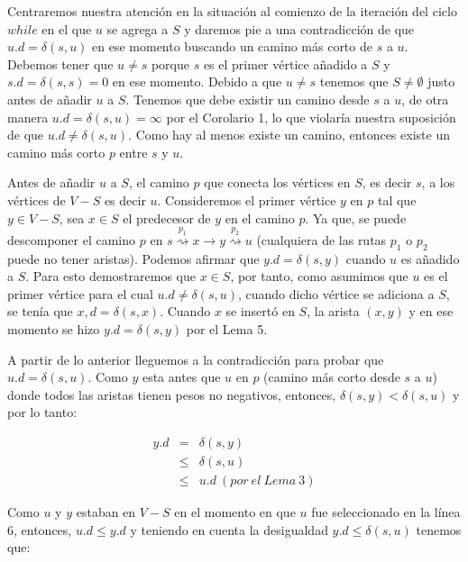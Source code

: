 \documentclass[12pt]{article}
\newcommand{\nl}{\vspace{0.3cm}}
\begin{document}
\nl

Centraremos nuestra atención en la situación al comienzo de la iteración del ciclo $while$ en el que $u$ se agrega a $S$ y daremos pie a una contradicción de que $u.d = \delta(s, u)$ en ese momento buscando un camino más corto de $s$ a $u$. Debemos tener que $u \neq s$ porque $s$ es el primer vértice añadido a $S$ y $s.d = \delta(s, s) = 0$ en ese momento. Debido a que $u \neq s$ tenemos que $S \neq \emptyset$ justo antes de añadir $u$ a $S$. Tenemos que debe existir un camino desde $s$ a $u$, de otra manera $u.d = \delta(s, u) = \infty$ por el Corolario 1, lo que violaría nuestra suposición de que $u.d \neq \delta(s, u)$. Como hay al menos existe un camino, entonces existe un camino más corto $p$ entre $s$ y $u$.

\nl

Antes de añadir $u$ a $S$, el camino $p$ que conecta los vértices en $S$, es decir $s$, a los vértices de $V - S$ es decir $u$. Consideremos el primer vértice $y$ en $p$ tal que $y \in V - S$, sea $x \in S$ el predecesor de $y$ en el camino $p$. Ya que, se puede descomponer el camino $p$ en $ s \stackrel{p_1}{\rightsquigarrow} x \rightarrow y \stackrel{p_2}{\rightsquigarrow} u $ (cualquiera de las rutas $p_1$ o $p_2$ puede no tener aristas). Podemos afirmar que $ y.d = \delta(s, y) $ cuando $u$ es añadido a $S$. Para esto demostraremos que $x \in S$, por tanto, como asumimos que $u$ es el primer vértice para el cual $u.d \neq \delta(s, u)$, cuando dicho vértice se adiciona a $S$, se tenía que $x,d = \delta(s, x)$. Cuando $x$ se insertó en $S$, la arista $(x, y)$ y en ese momento se hizo $y.d = \delta(s, y)$ por el Lema 5.

\newpage

A partir de lo anterior lleguemos a la contradicción para probar que $u.d = \delta(s, u)$. Como $y$ esta antes que $u$ en $p$ (camino más corto desde $s$ a $u$) donde todos las aristas tienen pesos no negativos, entonces, $\delta(s, y) < \delta(s, u)$ y por lo tanto:

\begin{eqnarray*}
	y.d & = & \delta(s, y) \\
	& \leqslant & \delta(s, u) \\
	& \leqslant & u.d \ (por\ el\ Lema\ 3)
\end{eqnarray*}

Como $u$ y $y$ estaban en $V - S$ en el momento en que $u$ fue seleccionado en la línea 6, entonces,  $u.d \leqslant y.d$ y teniendo en cuenta la desigualdad $y.d \leqslant \delta(s, u)$ tenemos que:
\end{document}
